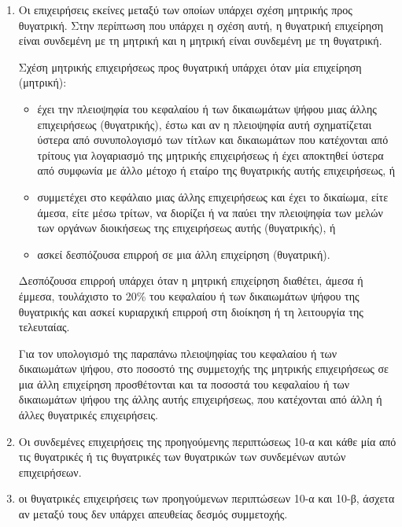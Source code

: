 \documentclass[A4,10pt,greek]{book}
\begin{document}
\begin{enumerate}

\item Οι επιχειρήσεις εκείνες μεταξύ των οποίων υπάρχει σχέση μητρικής προς θυγατρική. Στην περίπτωση που υπάρχει η σχέση αυτή, η θυγατρική επιχείρηση είναι συνδεμένη με τη μητρική και η μητρική είναι συνδεμένη με τη θυγατρική.

Σχέση μητρικής επιχειρήσεως προς θυγατρική υπάρχει όταν μία επιχείρηση (μητρική):

\begin{itemize}

\item έχει την πλειοψηφία του κεφαλαίου ή των δικαιωμάτων ψήφου μιας άλλης επιχειρήσεως (θυγατρικής), έστω και αν η πλειοψηφία αυτή σχηματίζεται ύστερα από συνυπολογισμό των τίτλων και δικαιωμάτων που κατέχονται από τρίτους για λογαριασμό της μητρικής επιχειρήσεως ή έχει αποκτηθεί ύστερα από συμφωνία με άλλο μέτοχο ή εταίρο της θυγατρικής αυτής επιχειρήσεως, ή

\item συμμετέχει στο κεφάλαιο μιας άλλης επιχειρήσεως και έχει το δικαίωμα, είτε άμεσα, είτε μέσω τρίτων, να διορίζει ή να παύει την πλειοψηφία των μελών των οργάνων διοικήσεως της επιχειρήσεως αυτής (θυγατρικής), ή

\item ασκεί δεσπόζουσα επιρροή σε μια άλλη επιχείρηση (θυγατρική).

\end{itemize}
Δεσπόζουσα επιρροή υπάρχει όταν η μητρική επιχείρηση διαθέτει, άμεσα ή έμμεσα, τουλάχιστο το 20\% του κεφαλαίου ή των δικαιωμάτων ψήφου της θυγατρικής και ασκεί κυριαρχική επιρροή στη διοίκηση ή τη λειτουργία της τελευταίας.

Για τον υπολογισμό της παραπάνω πλειοψηφίας του κεφαλαίου ή των δικαιωμάτων ψήφου, στο ποσοστό της συμμετοχής της μητρικής επιχειρήσεως σε μια άλλη επιχείρηση προσθέτονται και τα ποσοστά του κεφαλαίου ή των δικαιωμάτων ψήφου της άλλης αυτής επιχειρήσεως, που κατέχονται από άλλη ή άλλες θυγατρικές επιχειρήσεις.

\item Οι συνδεμένες επιχειρήσεις της προηγούμενης περιπτώσεως 10-α και κάθε μία από τις θυγατρικές ή τις θυγατρικές των θυγατρικών των συνδεμένων αυτών επιχειρήσεων.

\item οι θυγατρικές επιχειρήσεις των προηγούμενων περιπτώσεων 10-α και 10-β, άσχετα αν μεταξύ τους δεν υπάρχει απευθείας δεσμός συμμετοχής.

\end{enumerate}
\end{document}
